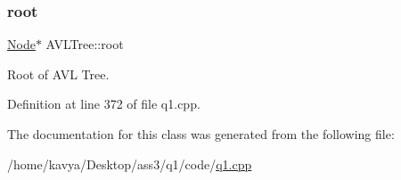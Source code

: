\subsubsection{\texorpdfstring{root}{root}}
{\footnotesize\ttfamily \hyperlink{class_node}{Node}$\ast$ A\+V\+L\+Tree\+::root}



Root of A\+VL Tree. 



Definition at line 372 of file q1.\+cpp.



The documentation for this class was generated from the following file\+:\begin{DoxyCompactItemize}
\item 
/home/kavya/\+Desktop/ass3/q1/code/\hyperlink{q1_8cpp}{q1.\+cpp}\end{DoxyCompactItemize}
